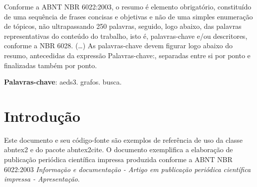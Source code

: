 \documentclass[
article,			%
11pt,				%
oneside,			%
a4paper,			%
english,			%
brazil,				%
sumario=tradicional
]{/usr/local/share/texmf/tex/latex/abntex2/abntex2}
\begin{document}
	
	
	\frenchspacing 
	
	
	\maketitle
	
	\begin{resumoumacoluna}
		Conforme a ABNT NBR 6022:2003, o resumo é elemento obrigatório, constituído de
		uma sequência de frases concisas e objetivas e não de uma simples enumeração
		de tópicos, não ultrapassando 250 palavras, seguido, logo abaixo, das palavras
		representativas do conteúdo do trabalho, isto é, palavras-chave e/ou
		descritores, conforme a NBR 6028. (\ldots) As palavras-chave devem figurar logo
		abaixo do resumo, antecedidas da expressão Palavras-chave:, separadas entre si por
		ponto e finalizadas também por ponto.
		
		\vspace{\onelineskip}
		
		\noindent
		\textbf{Palavras-chave}: aeds3. grafos. busca.
	\end{resumoumacoluna}
	
	
	\textual
	
	\section*{Introdução}
	
	Este documento e seu código-fonte são exemplos de referência de uso da classe
	\textsf{abntex2} e do pacote \textsf{abntex2cite}. O documento exemplifica a
	elaboração de publicação periódica científica impressa produzida conforme a ABNT
	NBR 6022:2003 \emph{Informação e documentação - Artigo em publicação periódica
		científica impressa - Apresentação}.
	
\end{document}
